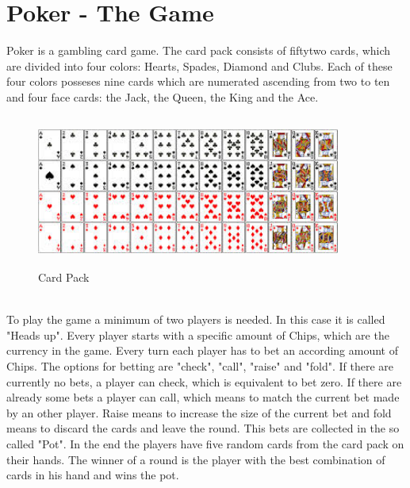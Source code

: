 \documentclass[12pt,fleqn,a4paper]{article}
\begin{document}
\section{Poker - The Game}
Poker is a gambling card game. The card pack consists of fiftytwo cards, which are divided into four colors: Hearts, Spades, Diamond and Clubs. Each of these four colors posseses nine cards which are numerated ascending from two to ten and four face cards: the Jack, the Queen, the King and the Ace.
\begin{figure}[!h]
	\begin{center}
		\includegraphics[width=10cm, height=5cm]{cards.jpg}
		\caption{Card Pack}
	\end{center}
\end{figure}
\\
To play the game a minimum of two players is needed. In this case it is called "Heads up". Every player starts with a specific amount of Chips, which are the currency in the game. Every turn each player has to bet an according amount of Chips. The options for betting are "check", "call", "raise" and "fold". If there are currently no bets, a player can check, which is equivalent to bet zero. If there are already some bets a player can call, which means to match the current bet made by an other player. Raise means to increase the size of the current bet and fold means to discard the cards and leave the round. This bets are collected in the so called "Pot". In the end the players have five random cards from the card pack on their hands. The winner of a round is the player with the best combination of cards in his hand and wins the pot.
\end{document}
